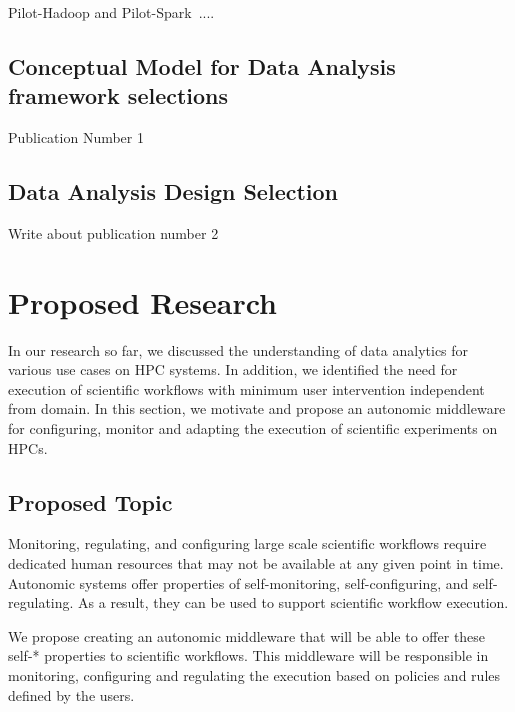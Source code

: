 Pilot-Hadoop and Pilot-Spark~\cite{luckow2016hadoop}....

\subsection{Conceptual Model for Data Analysis framework selections}

Publication Number 1 ~\cite{paraskevakos2018task}

\subsection{Data Analysis Design Selection}

Write about publication number 2

\section{Proposed Research}

In our research so far, we discussed the understanding of data analytics for various use cases on HPC systems. In addition, we identified the need for execution of scientific workflows with minimum user intervention independent from domain. In this section, we motivate and propose an autonomic middleware for configuring, monitor and adapting the execution of scientific experiments on HPCs.

\subsection{Proposed Topic}
Monitoring, regulating, and configuring large scale scientific workflows require dedicated human resources that may not be available at any given point in time. Autonomic systems offer properties of self-monitoring, self-configuring, and self-regulating. As a result, they can be used to support scientific workflow execution.

We propose creating an autonomic middleware that will be able to offer these self-* properties to scientific workflows. This middleware will be responsible in monitoring, configuring and regulating the execution based on policies and rules defined by the users. 

